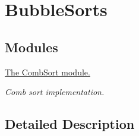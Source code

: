 \hypertarget{group__BubbleSorts}{}\section{Bubble\+Sorts}
\label{group__BubbleSorts}
\subsection*{Modules}
\begin{DoxyCompactItemize}
\item 
\hyperlink{group__CombSort}{The Comb\+Sort module.}
\begin{DoxyCompactList}\small\item\em Comb sort implementation. \end{DoxyCompactList}\end{DoxyCompactItemize}


\subsection{Detailed Description}
